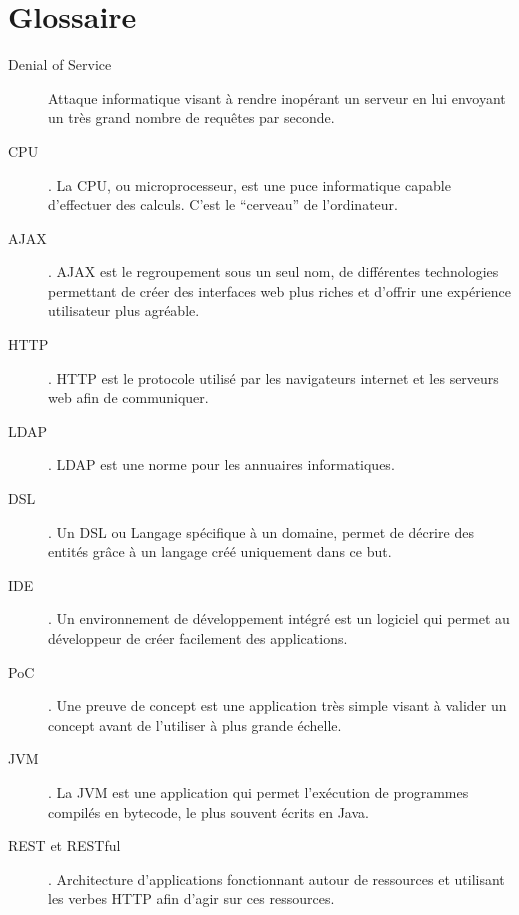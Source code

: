 \chapter{Glossaire}
\begin{description}
\item[Denial of Service] Attaque informatique visant à rendre inopérant un serveur en lui envoyant un très grand nombre de requêtes par seconde.
\item[CPU] . La CPU, ou microprocesseur, est une puce informatique capable d'effectuer des calculs. C'est le ``cerveau'' de l'ordinateur.
\item[AJAX] . AJAX est le regroupement sous un seul nom, de différentes technologies permettant de créer des interfaces web plus riches et d'offrir une expérience utilisateur plus agréable.
\item[HTTP] . HTTP est le protocole utilisé par les navigateurs internet et les serveurs web afin de communiquer.
\item[LDAP] . LDAP est une norme pour les annuaires informatiques.
\item[DSL] . Un DSL ou Langage spécifique à un domaine, permet de décrire des entités grâce à un langage créé uniquement dans ce but.
\item[IDE] . Un environnement de développement intégré est un logiciel qui permet au développeur de créer facilement des applications.
\item[PoC] . Une preuve de concept est une application très simple visant à valider un concept avant de l'utiliser à plus grande échelle.
\item[JVM] . La JVM est une application qui permet l'exécution de programmes compilés en bytecode, le plus souvent écrits en Java. 
\item[REST et RESTful] . Architecture d'applications fonctionnant autour de ressources et utilisant les verbes HTTP afin d'agir sur ces ressources.
\end{description} 